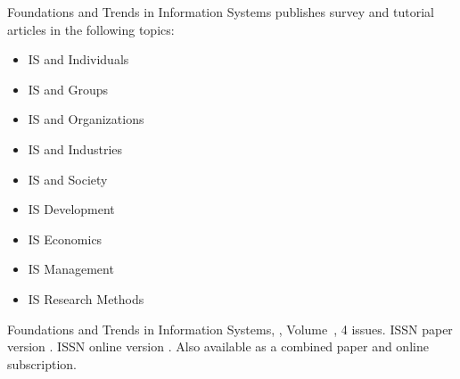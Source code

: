 


\journalaimsandscope
 {%
  Foundations and Trends\textsuperscript{\textregistered} in
Information Systems publishes
 survey and tutorial articles in the following topics: 
\begin{itemize}
\item{IS and Individuals}
\item{IS and Groups}
\item{IS and Organizations}
\item{IS and Industries}
\item{IS and Society}
\item{IS Development}
\item{IS Economics}
\item{IS Management}
\item{IS Research Methods}
\end{itemize}
 }

\journallibraryinfo
 {%
  Foundations and Trends\textsuperscript{\textregistered} in
  Information Systems, ,
  Volume~, 4 issues.
  ISSN paper version .
  ISSN online version .
  Also available as a combined paper and online
  subscription.
 } 